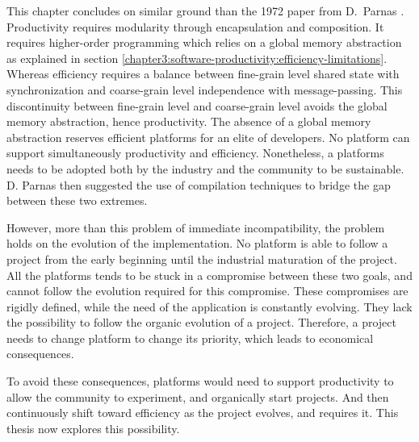 This chapter concludes on similar ground than the 1972 paper from D.~Parnas \cite{Parnas1972}.
Productivity requires modularity through encapsulation and composition.
It requires higher-order programming which relies on a global memory abstraction as explained in section \ref{chapter3:software-productivity:efficiency-limitations}.
Whereas efficiency requires a balance between fine-grain level shared state with synchronization and coarse-grain level independence with message-passing.
This discontinuity between fine-grain level and coarse-grain level avoids the global memory abstraction, hence productivity.
The absence of a global memory abstraction reserves efficient platforms for an elite of developers.
No platform can support simultaneously productivity and efficiency.
Nonetheless, a platforms needs to be adopted both by the industry and the community to be sustainable.
D. Parnas then suggested the use of compilation techniques to bridge the gap between these two extremes.

However, more than this problem of immediate incompatibility, the problem holds on the evolution of the implementation.
No platform is able to follow a project from the early beginning until the industrial maturation of the project.
All the platforms tends to be stuck in a compromise between these two goals, and cannot follow the evolution required for this compromise.
These compromises are rigidly defined, while the need of the application is constantly evolving.
They lack the possibility to follow the organic evolution of a project.
Therefore, a project needs to change platform to change its priority, which leads to economical consequences.

To avoid these consequences, platforms would need to support productivity to allow the community to experiment, and organically start projects.
And then continuously shift toward efficiency as the project evolves, and requires it.
This thesis now explores this possibility.

                                    \endinput


Some links I NEED to put :
--------------------------

http://calculist.org/blog/2011/12/14/why-coroutines-wont-work-on-the-web/

Albert Cohen
https://scholar.google.com/citations?user=MkKZKAMAAAAJ&hl=en

